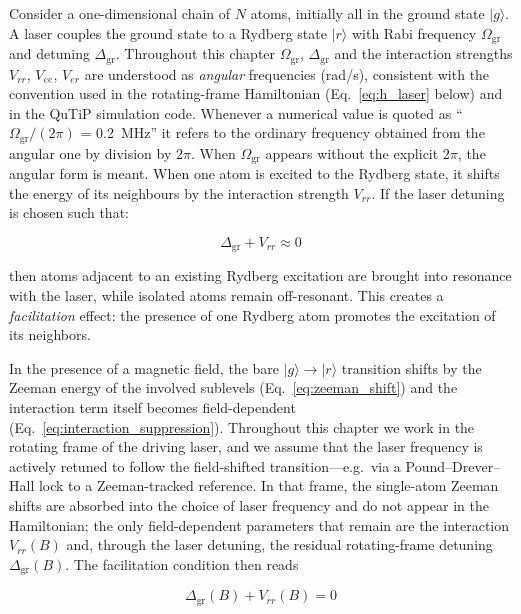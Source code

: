 Consider a one-dimensional chain of $N$ atoms, initially all in the ground state $|g\rangle$. A laser couples the ground state to a Rydberg state $|r\rangle$ with Rabi frequency $\Omega_{\mathrm{gr}}$ and detuning $\Delta_{\mathrm{gr}}$. Throughout this chapter $\Omega_{\mathrm{gr}}$, $\Delta_{\mathrm{gr}}$ and the interaction strengths $V_{rr}$, $V_{ee}$, $V_{er}$ are understood as \emph{angular} frequencies (rad/s), consistent with the convention used in the rotating-frame Hamiltonian (Eq.~\eqref{eq:h_laser} below) and in the QuTiP simulation code. Whenever a numerical value is quoted as ``$\Omega_{\mathrm{gr}}/(2\pi)$ = 0.2~MHz'' it refers to the ordinary frequency obtained from the angular one by division by $2\pi$. When $\Omega_{\mathrm{gr}}$ appears without the explicit $2\pi$, the angular form is meant. When one atom is excited to the Rydberg state, it shifts the energy of its neighbours by the interaction strength $V_{rr}$. If the laser detuning is chosen such that:

\begin{equation}
    \Delta_{\mathrm{gr}} + V_{rr} \approx 0
    \label{eq:facilitation_condition}
\end{equation}

then atoms adjacent to an existing Rydberg excitation are brought into resonance with the laser, while isolated atoms remain off-resonant. This creates a \textit{facilitation} effect: the presence of one Rydberg atom promotes the excitation of its neighbors.

In the presence of a magnetic field, the bare $|g\rangle \to |r\rangle$ transition shifts by the Zeeman energy of the involved sublevels (Eq.~\eqref{eq:zeeman_shift}) and the interaction term itself becomes field-dependent (Eq.~\eqref{eq:interaction_suppression}). Throughout this chapter we work in the rotating frame of the driving laser, and we assume that the laser frequency is actively retuned to follow the field-shifted transition---e.g.\ via a Pound--Drever--Hall lock to a Zeeman-tracked reference. In that frame, the single-atom Zeeman shifts are absorbed into the choice of laser frequency and do not appear in the Hamiltonian; the only field-dependent parameters that remain are the interaction $V_{rr}(B)$ and, through the laser detuning, the residual rotating-frame detuning $\Delta_{\mathrm{gr}}(B)$. The facilitation condition then reads

\begin{equation}
    \Delta_{\mathrm{gr}}(B) + V_{rr}(B) = 0
    \label{eq:facilitation_condition_b}
\end{equation}

